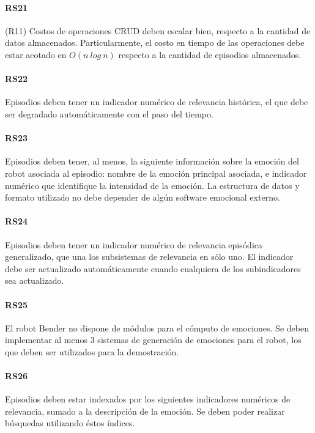 \paragraph{RS21}
(R11) Costos de operaciones CRUD deben escalar bien, respecto a la cantidad de datos almacenados. Particularmente, el costo en tiempo de las operaciones debe estar acotado en $O(n\ log\ n)$ respecto a la cantidad de episodios almacenados.

\paragraph{RS22}
Episodios deben tener un indicador numérico de relevancia histórica, el que debe ser degradado automáticamente con el paso del tiempo.

\paragraph{RS23}
Episodios deben tener, al menos, la siguiente información sobre la emoción del robot asociada al episodio: nombre de la emoción principal asociada, e indicador numérico que identifique la intensidad de la emoción. La estructura de datos y formato utilizado no debe depender de algún software emocional externo.

\paragraph{RS24}
Episodios deben tener un indicador numérico de relevancia episódica generalizado, que una los subsistemas de relevancia en sólo uno. El indicador debe ser actualizado automáticamente cuando cualquiera de los subindicadores sea actualizado.

\paragraph{RS25}
El robot Bender no dispone de módulos para el cómputo de emociones. Se deben implementar al menos 3 sistemas de generación de emociones para el robot, los que deben ser utilizados para la demostración.

\paragraph{RS26}
Episodios deben estar indexados por los siguientes indicadores numéricos de relevancia, sumado a la descripción de la emoción. Se deben poder realizar búsquedas utilizando éstos índices.

